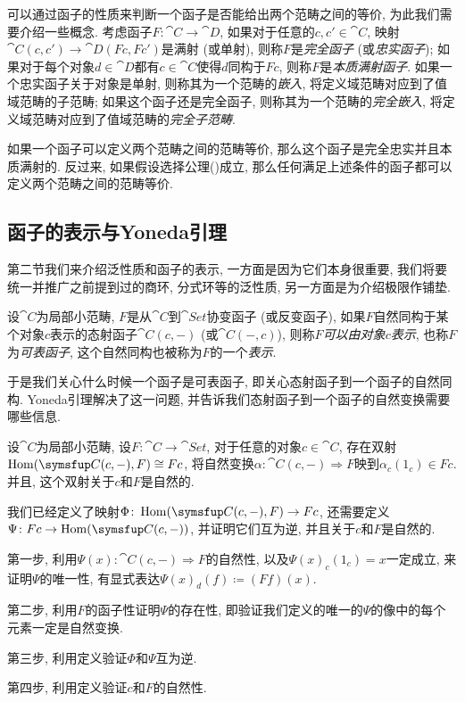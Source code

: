 可以通过函子的性质来判断一个函子是否能给出两个范畴之间的等价, 为此我们需要介绍一些概念. 考虑函子$F\colon\cat{C}\to\cat{D}$, 如果对于任意的$c, c'\in \cat{C}$, 映射$\cat{C}(c, c')\to \cat{D}(Fc, Fc')$是满射 (或单射), 则称$F$是\emph{完全函子} (或\emph{忠实函子}); 如果对于每个对象$d\in \cat{D}$都有$c\in\cat{C}$使得$d$同构于$Fc$, 则称$F$是\emph{本质满射函子}. 如果一个忠实函子关于对象是单射, 则称其为一个范畴的\emph{嵌入}, 将定义域范畴对应到了值域范畴的子范畴; 如果这个函子还是完全函子, 则称其为一个范畴的\emph{完全嵌入}, 将定义域范畴对应到了值域范畴的\emph{完全子范畴}.

\begin{theoremnoproof}\label{thm:categoryequivalence}
  如果一个函子可以定义两个范畴之间的范畴等价, 那么这个函子是完全忠实并且本质满射的. 反过来, 如果假设选择公理()成立, 那么任何满足上述条件的函子都可以定义两个范畴之间的范畴等价.
\end{theoremnoproof}

\subsection{函子的表示与Yoneda引理}

第二节我们来介绍泛性质和函子的表示, 一方面是因为它们本身很重要, 我们将要统一并推广之前提到过的商环, 分式环等的泛性质, 另一方面是为介绍极限作铺垫.

设$\cat{C}$为局部小范畴, $F$是从$\cat{C}$到$\cat{Set}$协变函子 (或反变函子), 如果$F$自然同构于某个对象$c$表示的态射函子$\cat{C}(c, -)$ (或$\cat{C}(-, c)$), 则称$F$\emph{可以由对象$c$表示}, 也称$F$为\emph{可表函子}, 这个自然同构也被称为$F$的一个\emph{表示}.

于是我们关心什么时候一个函子是可表函子, 即关心态射函子到一个函子的自然同构. Yoneda引理解决了这一问题, 并告诉我们态射函子到一个函子的自然变换需要哪些信息.

\begin{theorem}\label{thm:yonedalemma}
  设$\cat{C}$为局部小范畴, 设$F\colon \cat{C}\to\cat{Set}$, 对于任意的对象$c\in\cat{C}$, 存在双射$\Hom (\cat{C}(c, -), F)\cong Fc$, 将自然变换$\alpha\colon \cat{C}(c, -)\Rightarrow F$映到$\alpha_c(1_c)\in Fc$. 并且, 这个双射关于$c$和$F$是自然的.
\end{theorem}

\begin{proofhint}
  我们已经定义了映射$\Phi\colon \Hom (\cat{C}(c, -), F)\to Fc$, 还需要定义$\Psi\colon Fc\to\Hom (\cat{C}(c, -))$, 并证明它们互为逆, 并且关于$c$和$F$是自然的.

  第一步, 利用$\Psi(x)\colon \cat{C}(c, -)\Rightarrow F$的自然性, 以及$\Psi(x)_c(1_c)=x$一定成立, 来证明$\Psi$的唯一性, 有显式表达$\Psi(x)_d(f)\coloneq (Ff)(x)$.

  第二步, 利用$F$的函子性证明$\Psi$的存在性, 即验证我们定义的唯一的$\Psi$的像中的每个元素一定是自然变换.

  第三步, 利用定义验证$\Phi$和$\Psi$互为逆.

  第四步, 利用定义验证$c$和$F$的自然性.
\end{proofhint}

